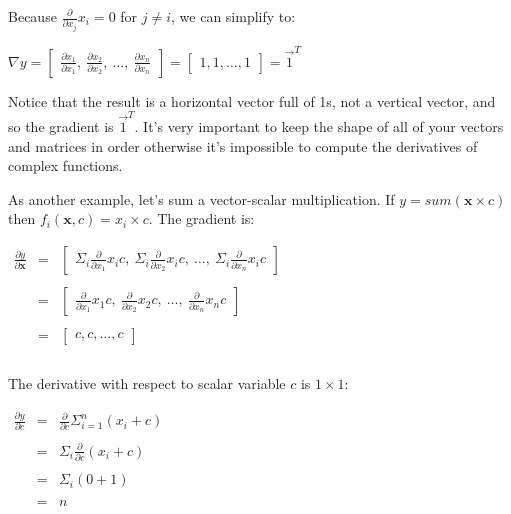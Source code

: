 \documentclass[11pt]{article}
\begin{document}
Because $\frac{\partial}{\partial x_j} x_i = 0$ for $j \neq i$, we can simplify to:

$\nabla y = \begin{bmatrix} \frac{\partial x_1}{\partial x_1},~ \frac{\partial x_2}{\partial x_2},~ \ldots,~ \frac{\partial x_n}{\partial x_n}  \end{bmatrix} = \begin{bmatrix}1, 1, \ldots, 1\end{bmatrix} = \vec{1}^T$

Notice that the result is a horizontal vector full of 1s, not a vertical vector, and so the gradient is $\vec{1}^T$. It's very important to keep the shape of all of your vectors and matrices in order otherwise it's impossible to compute the derivatives of complex functions.

As another example, let's sum a vector-scalar multiplication.  If $y = sum(\mathbf{x} \times c)$ then $f_i(\mathbf{x},c) = x_i \times c$. The gradient is:

$
\begin{array}{lcl}
\frac{\partial y}{\partial \mathbf{x}} & = & \begin{bmatrix} \Sigma_i \frac{\partial}{\partial x_1} x_i c,~ \Sigma_i \frac{\partial }{\partial x_2} x_i c,~ \ldots,~ \Sigma_i \frac{\partial}{\partial x_n} x_i c  \end{bmatrix}\\\\
 & = & \begin{bmatrix} \frac{\partial}{\partial x_1} x_1 c,~ \frac{\partial }{\partial x_2} x_2 c,~ \ldots,~ \frac{\partial}{\partial x_n} x_n c  \end{bmatrix}\\\\
 & = & \begin{bmatrix} c, c, \ldots, c \end{bmatrix}\\\\
\end{array}
$

The derivative with respect to scalar variable $c$ is $1 \times 1$:

$
\begin{array}{lcl}
\frac{\partial y}{\partial c} & = & \frac{\partial}{\partial c} \Sigma_{i=1}^n (x_i+c)\\\\
& = & \Sigma_i \frac{\partial}{\partial c} (x_i+c)\\\\
& = & \Sigma_i (0 + 1)\\\\
& = & n
\end{array}
$
\end{document}
